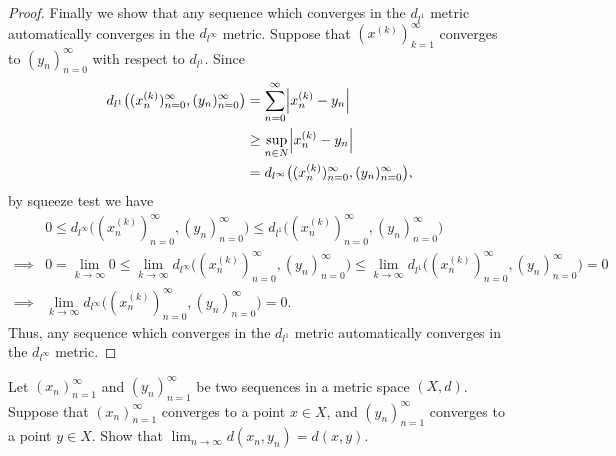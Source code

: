 \begin{proof}
  Finally we show that any sequence which converges in the \(d_{l^1}\) metric automatically converges in the \(d_{l^\infty}\) metric.
  Suppose that \((x^{(k)})_{k = 1}^\infty\) converges to \((y_n)_{n = 0}^\infty\) with respect to \(d_{l^1}\).
  Since
  \begin{align*}
    d_{l^1}\big((x_n^{(k)})_{n = 0}^\infty, (y_n)_{n = 0}^\infty\big) & = \sum_{n = 0}^\infty \abs{x_n^{(k)} - y_n}                               \\
                                                                      & \geq \sup_{n \in N} \abs{x_n^{(k)} - y_n}                                 \\
                                                                      & = d_{l^\infty}\big((x_n^{(k)})_{n = 0}^\infty, (y_n)_{n = 0}^\infty\big),
  \end{align*}
  by squeeze test we have
  \begin{align*}
             & 0 \leq d_{l^\infty}\big((x_n^{(k)})_{n = 0}^\infty, (y_n)_{n = 0}^\infty\big) \leq d_{l^1}\big((x_n^{(k)})_{n = 0}^\infty, (y_n)_{n = 0}^\infty\big)                                                                     \\
    \implies & 0 = \lim_{k \to \infty} 0 \leq \lim_{k \to \infty} d_{l^\infty}\big((x_n^{(k)})_{n = 0}^\infty, (y_n)_{n = 0}^\infty\big) \leq \lim_{k \to \infty} d_{l^1}\big((x_n^{(k)})_{n = 0}^\infty, (y_n)_{n = 0}^\infty\big) = 0 \\
    \implies & \lim_{k \to \infty} d_{l^\infty}\big((x_n^{(k)})_{n = 0}^\infty, (y_n)_{n = 0}^\infty\big) = 0.
  \end{align*}
  Thus, any sequence which converges in the \(d_{l^1}\) metric automatically converges in the \(d_{l^\infty}\) metric.
\end{proof}

\begin{ex}\label{ii:ex:1.1.16}
  Let \((x_n)_{n = 1}^\infty\) and \((y_n)_{n = 1}^\infty\) be two sequences in a metric space \((X, d)\).
  Suppose that \((x_n)_{n = 1}^\infty\) converges to a point \(x \in X\), and \((y_n)_{n = 1}^\infty\) converges to a point \(y \in X\).
  Show that \(\lim_{n \to \infty} d(x_n, y_n) = d(x, y)\).
\end{ex}

